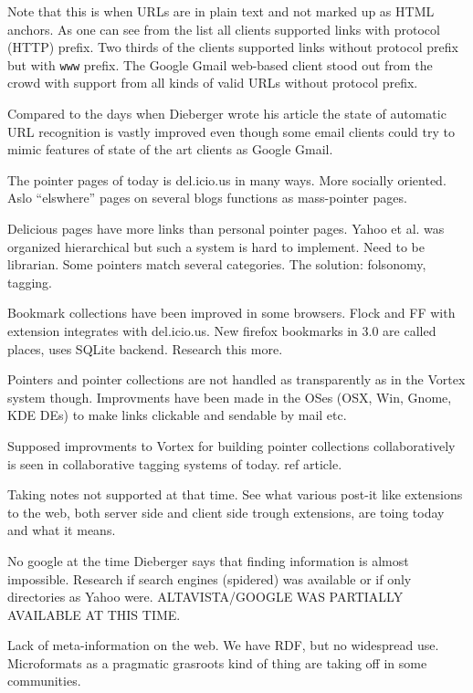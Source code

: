 \documentclass[12pt,a4paper]{article}
\begin{document}
Note that this is when URLs are in plain text and not marked up as
HTML anchors. As one can see from the list all clients supported links with
protocol (HTTP) prefix. Two thirds of the clients supported links without
protocol prefix but with \texttt{www} prefix. The Google Gmail web-based
client stood out from the crowd with support from all kinds of valid URLs
without protocol prefix.

Compared to the days when Dieberger wrote his article the state of automatic
URL recognition is vastly improved even though some email clients could try to
mimic features of state of the art clients as Google Gmail. 



The pointer pages of today is del.icio.us in many ways. More socially
oriented. Aslo ``elswhere'' pages on several blogs functions as mass-pointer
pages.

Delicious pages have more links than personal pointer pages. Yahoo et al. was
organized hierarchical but such a system is hard to implement. Need to be
librarian. Some pointers match several categories. The solution: folsonomy,
tagging.

Bookmark collections have been improved in some browsers. Flock and FF with
extension integrates with del.icio.us. New firefox bookmarks in 3.0 are called
places, uses SQLite backend. Research this more.

Pointers and pointer collections are not handled as transparently as in the
Vortex system though. Improvments have been made in the OSes (OSX, Win, Gnome,
KDE DEs) to make links clickable and sendable by mail etc.

Supposed improvments to Vortex for building pointer collections
collaboratively is seen in collaborative tagging systems of today. ref
article.

Taking notes not supported at that time. See what various post-it like
extensions to the web, both server side and client side trough extensions, are
toing today and what it means.

No google at the time Dieberger says that finding information is almost
impossible. Research if search engines (spidered) was available or if only
directories as Yahoo were. ALTAVISTA/GOOGLE WAS PARTIALLY AVAILABLE AT THIS
TIME.

Lack of meta-information on the web. We have RDF, but no widespread use.
Microformats as a pragmatic grasroots kind of thing are taking off in some
communities.
\end{document}
